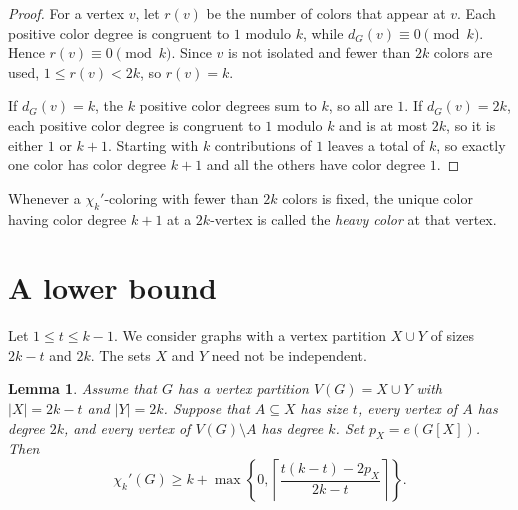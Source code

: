 \documentclass[11pt]{article}
\newtheorem{lemma}[theorem]{Lemma}
\newcommand{\chik}{\chi_k'}
\begin{document}
\begin{proof}
For a vertex $v$, let $r(v)$ be the number of colors that appear at
$v$. Each positive color degree is congruent to $1$ modulo $k$, while
$d_G(v)\equiv0\pmod{k}$. Hence $r(v)\equiv0\pmod{k}$. Since $v$ is not
isolated and fewer than $2k$ colors are used, $1\leq r(v)<2k$, so
$r(v)=k$.

If $d_G(v)=k$, the $k$ positive color degrees sum to $k$, so all are
$1$. If $d_G(v)=2k$, each positive color degree is congruent to $1$
modulo $k$ and is at most $2k$, so it is either $1$ or $k+1$. Starting
with $k$ contributions of $1$ leaves a total of $k$, so exactly one
color has color degree $k+1$ and all the others have color degree $1$.
\end{proof}

Whenever a $\chi_k'$-coloring with fewer than $2k$ colors is fixed, the
unique color having color degree $k+1$ at a $2k$-vertex is called the
\emph{heavy color} at that vertex.

\section{A lower bound}\label{sec:lower-bound}

Let $1\leq t\leq k-1$. We consider graphs with a vertex partition
$X\cup Y$ of sizes $2k-t$ and $2k$. The sets $X$ and $Y$ need not be
independent.

\begin{lemma}\label{lem:general-lower-bound}
Assume that $G$ has a vertex partition $V(G)=X\cup Y$ with $|X|=2k-t$ and
$|Y|=2k$. Suppose that $A\subseteq X$ has size $t$, every vertex of
$A$ has degree $2k$, and every vertex of $V(G)\setminus A$ has degree
$k$. Set $p_X=e(G[X])$. Then
\begin{equation}\label{eq:general-bound}
\chik(G)\geq
k+\max\left\{0,
\left\lceil\frac{t(k-t)-2p_X}{2k-t}\right\rceil
\right\}.
\end{equation}
\end{lemma}
\end{document}
